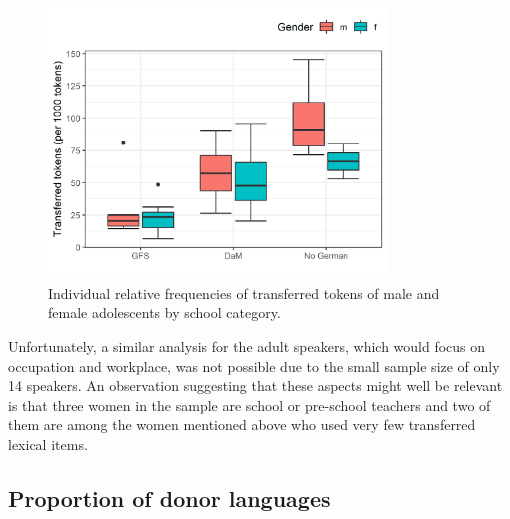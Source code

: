 \documentclass[output=paper]{langsci/langscibook}
\begin{document}
%
\begin{figure}
\includegraphics[width=0.8\textwidth]{figures/brackefig2.png}
 \caption{Individual relative frequencies of transferred tokens of male and female adolescents by school category.}
 \label{fig:bracke:2}
 \end{figure}
  

Unfortunately, a similar analysis for the adult speakers, which would focus on occupation and workplace, was not possible due to the small sample size of only 14 speakers. An observation suggesting that these aspects might well be relevant is that three women in the sample are school or pre-school teachers and two of them are among the women mentioned above who used very few transferred lexical items.

 
   
\subsection{Proportion of donor languages}
\label{sec:bracke:5.2}
\end{document}
